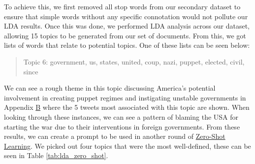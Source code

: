 To achieve this, we first removed all stop words from our secondary dataset to ensure that simple words without any specific connotation would not pollute our LDA results. Once this was done, we performed LDA analysis across our dataset, allowing 15 topics to be generated from our set of documents. From this, we got lists of words that relate to potential topics. One of these lists can be seen below:

\begin{quote}
    Topic 6: government, us, states, united, coup, nazi, puppet, elected, civil, since
    \label{quote:topic_6}
\end{quote}

We can see a rough theme in this topic discussing America's potential involvement in creating puppet regimes and instigating unstable governments in Appendix \hyperref[app:lda_results]{B} where the 5 tweets most associated with this topic are shown. When looking through these instances, we can see a pattern of blaming the USA for starting the war due to their interventions in foreign governments. From these results, we can create a prompt to be used in another round of \hyperref[zero_shot]{Zero-Shot Learning}. We picked out four topics that were the most well-defined, these can be seen in Table \ref{tab:lda_zero_shot}.

\begin{table}[htbp]
    \tiny
    \caption{Topics prompts created for Zero-Shot learning, generated through LDA analysis}
    \label{tab:lda_zero_shot}
\end{table}

